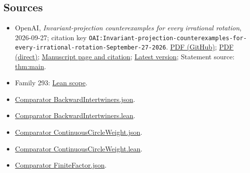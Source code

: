 \documentclass[11pt]{article}
\begin{document}
\subsection{Sources}
\begin{itemize}
\item OpenAI, \emph{Invariant-projection counterexamples for every irrational rotation}, 2026-09-27; citation key \texttt{OAI:Invariant-projection-counterexamples-for-every-irrational-rotation-September-27-2026}. \href{https://github.com/openai/math/blob/adc7f1241b42e322a6451854ab7e4b4c146bf78a/preprints/Invariant-projection-counterexamples-for-every-irrational-rotation-September-27-2026/paper.pdf}{PDF (GitHub)}; \href{https://github.com/openai/math/raw/adc7f1241b42e322a6451854ab7e4b4c146bf78a/preprints/Invariant-projection-counterexamples-for-every-irrational-rotation-September-27-2026/paper.pdf}{PDF (direct)}; \href{https://github.com/openai/math/blob/adc7f1241b42e322a6451854ab7e4b4c146bf78a/preprints/Invariant-projection-counterexamples-for-every-irrational-rotation-September-27-2026/README.md}{Manuscript page and citation}; \href{https://github.com/openai/math/blob/main/preprints/Invariant-projection-counterexamples-for-every-irrational-rotation-September-27-2026/paper.pdf}{Latest version}; Statement source: \href{https://github.com/openai/math/blob/adc7f1241b42e322a6451854ab7e4b4c146bf78a/preprints/Invariant-projection-counterexamples-for-every-irrational-rotation-September-27-2026/build/00-introduction.tex\#L33}{thm:main}.
\item Family 293: \href{https://github.com/openai/math/blob/adc7f1241b42e322a6451854ab7e4b4c146bf78a/lean/docs/293.md}{Lean scope}.
\item \href{https://github.com/openai/math/blob/adc7f1241b42e322a6451854ab7e4b4c146bf78a/lean/ComparatorChallenges/BackwardIntertwiners.json}{Comparator BackwardIntertwiners.json}.
\item \href{https://github.com/openai/math/blob/adc7f1241b42e322a6451854ab7e4b4c146bf78a/lean/ComparatorChallenges/BackwardIntertwiners.lean}{Comparator BackwardIntertwiners.lean}.
\item \href{https://github.com/openai/math/blob/adc7f1241b42e322a6451854ab7e4b4c146bf78a/lean/ComparatorChallenges/ContinuousCircleWeight.json}{Comparator ContinuousCircleWeight.json}.
\item \href{https://github.com/openai/math/blob/adc7f1241b42e322a6451854ab7e4b4c146bf78a/lean/ComparatorChallenges/ContinuousCircleWeight.lean}{Comparator ContinuousCircleWeight.lean}.
\item \href{https://github.com/openai/math/blob/adc7f1241b42e322a6451854ab7e4b4c146bf78a/lean/ComparatorChallenges/FiniteFactor.json}{Comparator FiniteFactor.json}.

\end{itemize}
\end{document}
